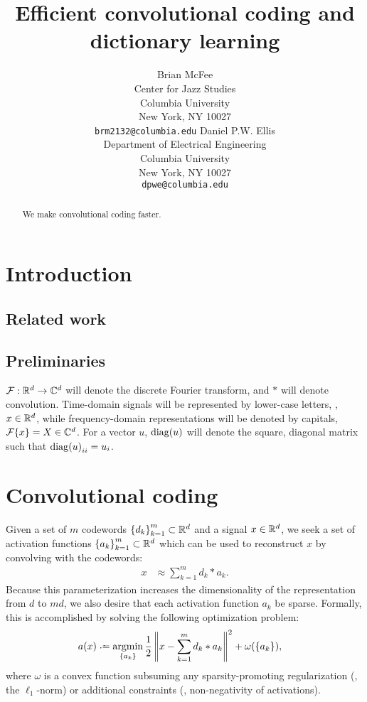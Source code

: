 \documentclass{article} %
\title{Efficient convolutional coding and dictionary learning}
\author{
Brian McFee\\
Center for Jazz Studies\\
Columbia University\\
New York, NY 10027 \\
\texttt{brm2132@columbia.edu}
\And
Daniel P.W. Ellis\\
Department of Electrical Engineering\\
Columbia University\\
New York, NY 10027\\
\texttt{dpwe@columbia.edu}
}
\begin{document}
\maketitle

\begin{abstract}
We make convolutional coding faster.
\end{abstract}

\section{Introduction}
\cite{mairal2010}


\subsection{Related work}

\subsection{Preliminaries}
$\mathcal{F}:\mathbb{R}^d\rightarrow\mathbb{C}^d$ will denote the discrete Fourier transform, and $*$ will denote
convolution.
Time-domain signals will be represented by lower-case letters, \eg, $x \in \mathbb{R}^d$, while
frequency-domain representations will be denoted by capitals, $\mathcal{F}\{x\} = X \in \mathbb{C}^d$.
For a vector $u$, $\operatorname{diag}(u)$ will denote the square, diagonal matrix such that 
${\operatorname{diag}(u)}_{ii} = u_i$.

\section{Convolutional coding}
\label{sec:convcode}
Given a set of $m$ codewords ${\{d_k\}}_{k=1}^m \subset \mathbb{R}^d$ and a signal $x\in\mathbb{R}^d$, 
we seek a set of activation functions ${\{a_k\}}_{k=1}^m\subset\mathbb{R}^d$ which
can be used to reconstruct $x$ by convolving with the codewords:
\begin{align}
x &\approx \sum_{k=1}^m d_k * a_k.\label{eq:convapprox}
\end{align}
Because this parameterization increases the dimensionality of the representation from $d$ 
to $md$, we also desire that each activation function $a_k$ be sparse.  
Formally, this is accomplished by solving the following optimization problem:
\begin{align}
a(x) &\defeq \argmin_{\{a_k\}} \frac{1}{2} \left\|x - \sum_{k=1}^m d_k * a_k\right\|^2 +
\omega(\{a_k\}), \label{eq:sisc}
\end{align}
where $\omega$ is a convex function subsuming any sparsity-promoting regularization 
(\eg, the $\ell_1$-norm) or additional constraints (\eg, non-negativity of activations).
\end{document}
